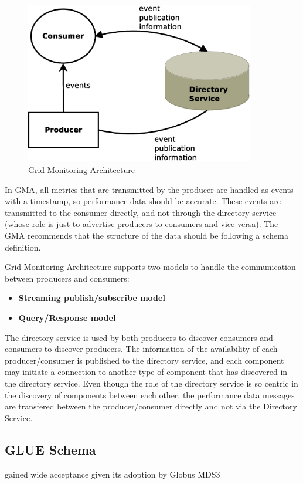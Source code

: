 \begin{figure}[htb]
\centering
 \includegraphics[width=100mm]{images/gma.eps}
\caption{Grid Monitoring Architecture}
\label{figure:gma}
\end{figure}

In GMA, all metrics that are transmitted by the producer are handled as events with a timestamp, so performance data should be accurate. These events are transmitted to the consumer directly, and not through the directory service (whose role is just to advertise producers to consumers and vice versa). The GMA recommends that the structure of the data should be following a schema definition. 

Grid Monitoring Architecture supports two models to handle the communication between producers and consumers:

\begin{itemize}
\item {\bf Streaming publish/subscribe model}
\item {\bf Query/Response model}
\end{itemize}

The directory service is used by both producers to discover consumers and consumers to discover producers. The information of the availability of each producer/consumer is published to the directory service, and each component may initiate a connection to another type of component that has discovered in the directory service. Even though the role of the directory service is so centric in the discovery of components between each other, the performance data messages are transfered between the producer/consumer directly and not via the Directory Service.

\subsection{GLUE Schema}
gained wide acceptance given its adoption by Globus MDS3

